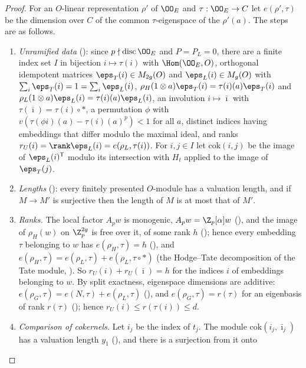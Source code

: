 \begin{proof}
For an $O$-linear representation $\rho'$ of $\OO_E$ and $\tau:\OO_E\to C$ let $e(\rho',\tau)$ be the dimension over
$C$ of the common $\tau$-eigenspace of the $\rho'(a)$. The steps are as follows.
\begin{enumerate}[label=(\arabic*)]
\item \emph{Unramified data} (): since $p\nmid\mathrm{disc}\,\OO_E$ and
$P=P_L=0$, there are a finite index set $I$ in bijection $i\mapsto\tau(i)$ with $\Hom(\OO_E,O)$, orthogonal idempotent
matrices $\eps_T(i)\in M_{2g}(O)$ and $\eps_L(i)\in M_g(O)$ with $\sum_i\eps_T(i)=1=\sum_i\eps_L(i)$,
$\rho_H(1\otimes a)\eps_T(i)=\tau(i)(a)\eps_T(i)$ and $\rho_L(1\otimes a)\eps_L(i)=\tau(i)(a)\eps_L(i)$, an involution
$i\mapsto\bar\imath$ with $\tau(\bar\imath)=\tau(i)\circ*$, a permutation $\phi$ with
$v(\tau(\phi i)(a)-\tau(i)(a)^p)<1$ for all $a$, distinct indices having embeddings that differ modulo the maximal
ideal, and ranks $r_U(i)=\rank\eps_L(i)=e(\rho_L,\tau(i))$. For $i,j\in I$
let $\mathrm{cok}(i,j)$ be the image of $\eps_L(i)^{\mathsf T}$ modulo its intersection with $H_t$ applied to the image
of $\eps_T(j)$.
\item \emph{Lengths} (): every finitely presented $O$-module has a
valuation length, and if $M\to M'$ is surjective then the length of $M$ is at most that of $M'$.
\item \emph{Ranks.} The local factor $A_pw$ is monogenic, $A_pw=\Z_p[\alpha]w$
(), and the image of $\rho_H(w)$ on $\Z_p^{2g}$ is free over it, of
some rank $h$ (); hence every embedding $\tau$ belonging
to $w$ has $e(\rho_H,\tau)=h$ (), and
$e(\rho_H,\tau)=e(\rho_L,\tau)+e(\rho_L,\tau\circ*)$ (the Hodge--Tate decomposition of the Tate module,
). So $r_U(i)+r_U(\bar\imath)=h$ for the indices $i$ of embeddings belonging
to $w$. By split exactness, eigenspace dimensions are additive:
$e(\rho_G,\tau)=e(N,\tau)+e(\rho_L,\tau)$ (), and
$e(\rho_G,\tau)=r(\tau)$ for an eigenbasis of rank $r(\tau)$
(); hence $r_U(i)\le r(\tau(i))\le d$.
\item \emph{Comparison of cokernels.} Let $i_j$ be the index of $t_j$. The module $\mathrm{cok}(i_j,\bar\imath_j)$ has a
valuation length $y_1$ (), and there is a surjection from it onto

\end{enumerate}
\end{proof}
